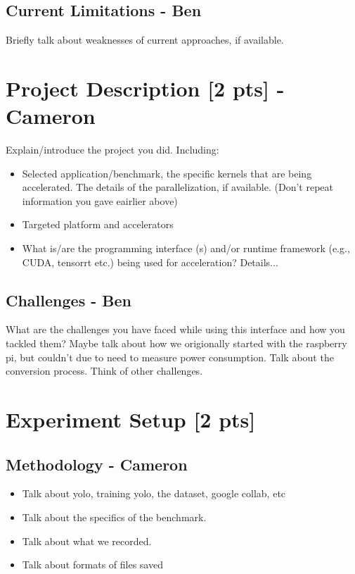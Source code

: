 \documentclass[sigconf,authorversion,nonacm]{acmart}
\begin{document}
\subsection{Current Limitations - Ben}
Briefly talk about weaknesses of current approaches, if available. 

\section{Project Description  {\small {[2 pts]}} - Cameron}
Explain/introduce the project you did. Including: 
\begin{itemize}
    \item Selected application/benchmark, the specific kernels that are being accelerated. The details of the parallelization, if available. (Don't repeat information you gave eairlier above)
    \item Targeted platform and accelerators
    \item What is/are the programming interface (s) and/or runtime framework (e.g., CUDA, tensorrt etc.) being used for acceleration? Details...
\end{itemize}

\subsection{Challenges - Ben}
What are the challenges you have faced  while using this interface and how you tackled them?
Maybe talk about how we origionally started with the raspberry pi, but couldn't due to need to measure power consumption. Talk about the conversion process. Think of other challenges.

\section{Experiment Setup  {\small {[2 pts]}}}

\subsection{Methodology - Cameron}  
\begin{itemize}
    \item Talk about yolo, training yolo, the dataset, google collab, etc
    \item Talk about the specifics of the benchmark.
    \item Talk about what we recorded.
    \item Talk about formats of files saved
\end{itemize}
\end{document}
